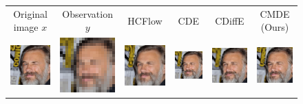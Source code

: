 \begin{figure}
  \begin{center}
  \begingroup
  \setlength{\tabcolsep}{2pt}

  \begin{tabular}{cccccc}
      Original image $x$ & Observation $ y$ & HCFlow & CDE & CDiffE & CMDE (Ours) \\

      \includegraphics[width=.15\textwidth]{Chapter2/samples/super-resolution/table/1/x.png} &   
      \includegraphics[width=.15\textwidth]{Chapter2/samples/super-resolution/table/1/y.png} &
      \includegraphics[width=.15\textwidth]{Chapter2/samples/super-resolution/table/1/hcflow.png} &
      \includegraphics[width=.15\textwidth]{Chapter2/samples/super-resolution/table/1/sr3.png} & 
      \includegraphics[width=.15\textwidth]{Chapter2/samples/super-resolution/table/1/Song.png} &
      \includegraphics[width=.15\textwidth]{Chapter2/samples/super-resolution/table/1/DV.png} \\


\end{tabular}
\end{center}
\end{figure}
